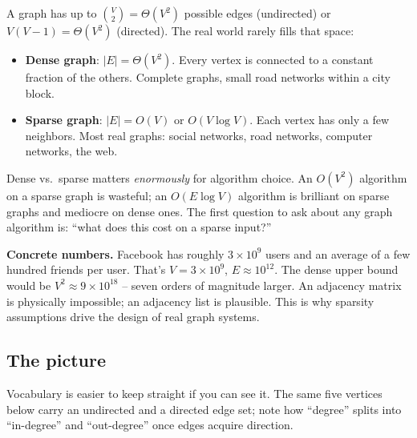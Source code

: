 \documentclass[11pt]{article}
\begin{document}
A graph has up to $\binom{V}{2} = \Theta(V^2)$ possible edges (undirected) or $V(V-1) = \Theta(V^2)$ (directed). The real world rarely fills that space:

\begin{itemize}[leftmargin=*]
    \item \textbf{Dense graph}: $|E| = \Theta(V^2)$. Every vertex is connected to a constant fraction of the others. Complete graphs, small road networks within a city block.
    \item \textbf{Sparse graph}: $|E| = O(V)$ or $O(V \log V)$. Each vertex has only a few neighbors. Most real graphs: social networks, road networks, computer networks, the web.
\end{itemize}

Dense vs.\ sparse matters \emph{enormously} for algorithm choice. An $O(V^2)$ algorithm on a sparse graph is wasteful; an $O(E \log V)$ algorithm is brilliant on sparse graphs and mediocre on dense ones. The first question to ask about any graph algorithm is: ``what does this cost on a sparse input?''

\begin{examplebox}
\textbf{Concrete numbers.} Facebook has roughly $3 \times 10^9$ users and an average of a few hundred friends per user. That's $V = 3 \times 10^9$, $E \approx 10^{12}$. The dense upper bound would be $V^2 \approx 9 \times 10^{18}$ -- seven orders of magnitude larger. An adjacency matrix is physically impossible; an adjacency list is plausible. This is why sparsity assumptions drive the design of real graph systems.
\end{examplebox}

\subsection*{The picture}

Vocabulary is easier to keep straight if you can see it. The same
five vertices below carry an undirected and a directed edge set;
note how ``degree'' splits into ``in-degree'' and ``out-degree'' once
edges acquire direction.

\begin{center}
\quad
{}
\end{center}
\end{document}
